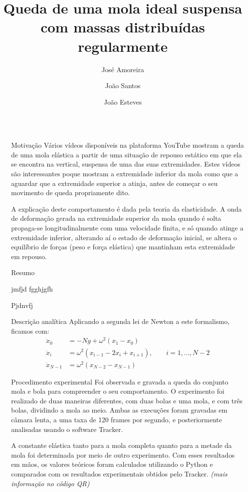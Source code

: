 \documentclass[final]{beamer}
\title{Queda de uma mola ideal suspensa com massas distribuídas regularmente}
\author{José Amoreira \inst{1,2,3} \and João Santos \inst{1} \and João Esteves \inst{1}}
\institute[]{\inst{1}Universidade da Beira Interior  \samelineand \inst{2} Centro de Matemática e Aplicações \and \inst{3} Laboratório de Instrumentação e Física Experimental de Partículas}
\newlength{\sepwidth}
\newlength{\colwidth}
\newcommand{\separatorcolumn}{\begin{column}{\sepwidth}\end{column}}
\begin{document}
\begin{frame}[t]
\begin{columns}[t]
\separatorcolumn

\begin{column}{\colwidth}

  \begin{block}{Motivação}
Vários vídeos disponíveis na plataforma YouTube mostram a queda de uma mola
elástica a partir de uma situação de repouso estático em que ela se encontra na
vertical, suspensa de uma das suas extremidades. Estes vídeos são interessantes
poque mostram a extremidade inferior da mola como que a aguardar que a
extremidade superior a atinja, antes de começar o seu movimento de queda
propriamente dito.

A explicação deste comportamento é dada pela teoria da elasticidade. A onda de
deformação gerada na extremidade superior da mola quando é solta propaga-se
longitudinalmente com uma velocidade finita, e só quando atinge a extremidade
inferior, alterando aí o estado de deformação inicial, se altera o equilíbrio de
forças (peso e força elástica) que mantinham esta extremidade em repouso.
  \end{block}
  
  \begin{alertblock}{Resumo}

    jmfjd fgghjgfh

    Pjdnvfj

  \end{alertblock}

\begin{block}{Descrição analítica}
    Aplicando a segunda lei de Newton a este formalismo, ficamos com:
    \begin{align*}
        \ddot x_0 &=-Ng+\omega^2(x_1-x_0)\\[1cm] 
        \ddot x_i &= \omega^2(x_{i-1}-2x_i+x_{i+1}),\qquad i=1, \ldots, N-2\\[1cm]
         \ddot x_{N-1} &=\omega^2(x_{N-2}-x_{N-1})
    \end{align*}    
\end{block}

\begin{block}{Procedimento experimental}
   Foi observada e gravada a queda do conjunto mola e bola para compreender o seu comportamento. O experimento foi realizado de duas maneiras diferentes, com duas bolas e uma mola, e com três bolas, dividindo a mola ao meio. Ambas as execuções foram gravadas em câmara lenta, a uma taxa de 120 frames por segundo, e posteriormente analisadas usando o software Tracker.
    
 A constante elástica tanto para a mola completa quanto para a metade da mola foi determinada por meio de outro experimento. Com esses resultados em mãos, os valores teóricos foram calculados utilizando o Python e comparados com os resultados experimentais obtidos pelo Tracker. \emph{(mais informação no código QR)}
\end{block}


\end{column}
\end{columns}
\end{frame}
\end{document}
